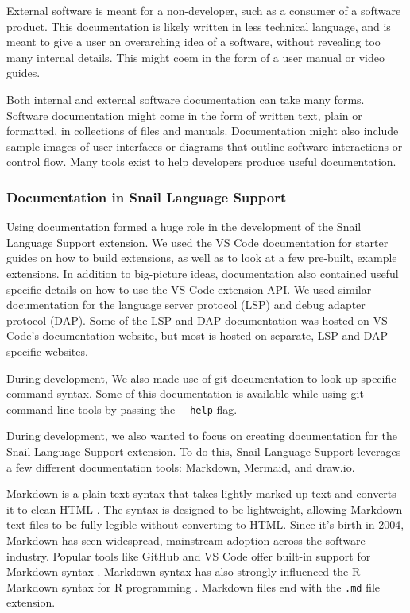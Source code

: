 \documentclass{article}
\begin{document}
External software is meant for a non-developer, such as a consumer of a software product. This documentation is likely written in less technical language, and is meant to give a user an overarching idea of a software, without revealing too many internal details. This might coem in the form of a user manual or video guides.

Both internal and external software documentation can take many forms. Software documentation might come in the form of written text, plain or formatted, in collections of files and manuals. Documentation might also include sample images of user interfaces or diagrams that outline software interactions or control flow. Many tools exist to help developers produce useful documentation.

\subsubsection{Documentation in Snail Language Support}

Using documentation formed a huge role in the development of the Snail Language Support extension. We used the VS Code documentation for starter guides on how to build extensions, as well as to look at a few pre-built, example extensions. In addition to big-picture ideas, documentation also contained useful specific details on how to use the VS Code extension API. We used similar documentation for the language server protocol (LSP) and debug adapter protocol (DAP). Some of the LSP and DAP documentation was hosted on VS Code's documentation website, but most is hosted on separate, LSP and DAP specific websites. 

During development, We also made use of git documentation to look up specific command syntax. Some of this documentation is available while using git command line tools by passing the \lstinline{--help} flag.

During development, we also wanted to focus on creating documentation for the Snail Language Support extension. To do this, Snail Language Support leverages a few different documentation tools: Markdown, Mermaid, and draw.io. 

Markdown is a plain-text syntax that takes lightly marked-up text and converts it to clean HTML \cite{Gruber_2004}. The syntax is designed to be lightweight, allowing Markdown text files to be fully legible without converting to HTML. Since it's birth in 2004, Markdown has seen widespread, mainstream adoption across the software industry. Popular tools like GitHub and VS Code offer built-in support for Markdown syntax \cite{GitHub_2023, Microsoft_2023k}. Markdown syntax has also strongly influenced the R Markdown syntax for R programming \cite{RStudio_2020}. Markdown files end with the \lstinline{.md} file extension. 
\end{document}

